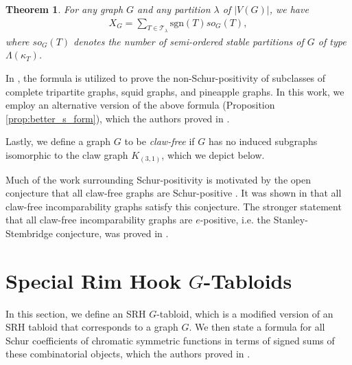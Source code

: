 \documentclass[12pt]{amsart}
\numberwithin{equation}{section}
\theoremstyle{plain}
\newtheorem{theorem}[equation]{Theorem}
\theoremstyle{definition}
\theoremstyle{remark}
\begin{document}
 \begin{theorem}\cite{WW2020}
 \label{thm:WW}
 For any graph $G$ and any partition $\lambda$ of $|V(G)|$, we have
 \begin{align*}
     [s_{\lambda}]X_G=\sum_{T\in \mathcal{T}_{\lambda}}\mathrm{sgn}(T)so_G(T),
 \end{align*}
 where $so_G(T)$ denotes the number of semi-ordered stable partitions of $G$ of type $\Lambda(\kappa_T)$.
 \end{theorem}

 
 In \cite{WW2020}, the formula is utilized to prove the non-Schur-positivity of subclasses of complete tripartite graphs, squid graphs, and pineapple graphs. In this work, we employ an alternative version of the above formula (Proposition \ref{prop:better_s_form}), which the authors proved in \cite{gen_nets}.


Lastly, we define a graph $G$ to be \textit{claw-free} if $G$ has no induced subgraphs isomorphic to the claw graph $K_{(3,1)}$, which we depict below.

\begin{figure}[H]
\centering
{}
\end{figure}

Much of the work surrounding Schur-positivity is motivated by the open conjecture that all claw-free graphs are Schur-positive \cite{stan_98}. It was shown in \cite{gash_96} that all claw-free incomparability graphs satisfy this conjecture. The stronger statement that all claw-free incomparability graphs are $e$-positive, i.e. the Stanley-Stembridge conjecture, was proved in \cite{hikita24}.

\section{Special Rim Hook $G$-Tabloids}
\label{sect:srh_G_tabs}

  In this section, we define an SRH $G$-tabloid, which is a modified version of an SRH tabloid that corresponds to a graph $G$. We then state a formula for all Schur coefficients of chromatic symmetric functions in terms of signed sums of these combinatorial objects, which the authors proved in \cite{gen_nets}.
 
\end{document}

